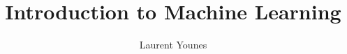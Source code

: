 \documentclass[12pt]{book}
\title{Introduction to Machine Learning}
\author{Laurent Younes}
\theoremstyle{plain}
\theoremstyle{break}
\newcommand{\problems}[1]{\newpage
\markright{PROBLEMS}
\section*{Problems}
\addcontentsline{toc}{section}{Problems}

}
\renewcommand{\problems}[1]{}
\begin{document}
\maketitle
\tableofcontents

\setlength{\parskip}{1em}






\problems{Problems_Optimization}




\problems{Problems_Bayes_Rule}



\problems{Problems_Kernels}



\problems{Problems_Linear_Regression}


\problems{Problems_Classification}






\problems{Problems_Neural_Networks}
\end{document}

